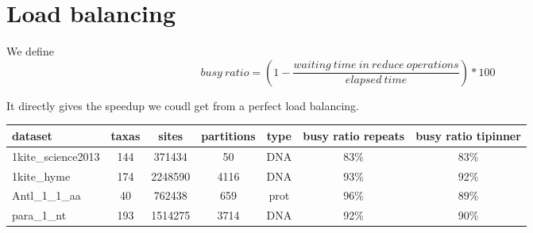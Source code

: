 \documentclass[a4paper]{article}
\begin{document}
\section{Load balancing}

We define
$$busy\ ratio = (1 - \frac{waiting\ time\ in\ reduce\ operations}{elapsed\ time}) * 100$$

It directly gives the speedup we coudl get from a perfect load balancing.

\begin{tabular}{|l|c|c|c|c|c|c|}
\hline dataset                    & taxas & sites    & partitions & type  & busy ratio repeats & busy ratio tipinner\\
\hline 1kite\_science2013         & 144   &  371434  & 50         & DNA  & 83\% & 83\%  \\
\hline 1kite\_hyme                & 174   &  2248590 & 4116       & DNA  & 93\% & 92\%  \\
\hline Antl\_1\_1\_aa             & 40    &  762438  & 659        & prot & 96\% & 89\%  \\
\hline para\_1\_nt                & 193   &  1514275 & 3714       & DNA  & 92\%  & 90\%  \\
\hline 
\end{tabular}\newline
\newline


\end{document}
